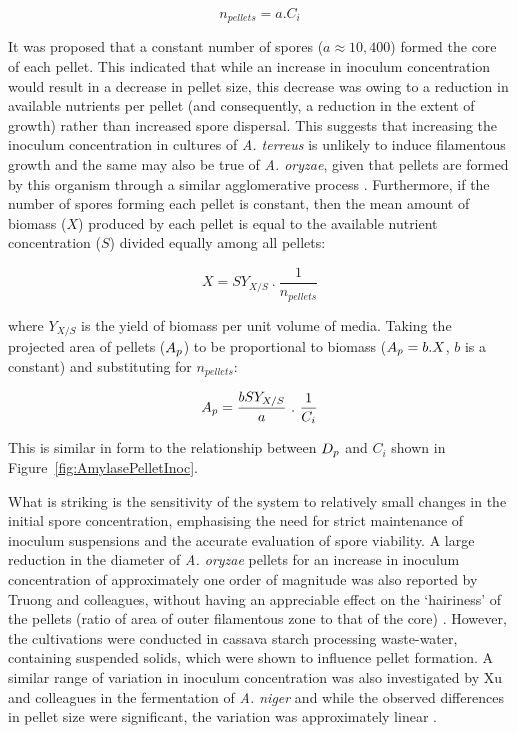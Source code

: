 \begin{equation}
	n_{pellets} = a . C_i
\end{equation}

\noindent It was proposed that a constant number of spores ($a \approx 10,400$) formed the core of each pellet. This indicated that while an increase in inoculum concentration would result in a decrease in pellet size, this decrease was owing to a reduction in available nutrients per pellet (and consequently, a reduction in the extent of growth) rather than increased spore dispersal. This suggests that increasing the inoculum concentration in cultures of \emph{A. terreus} is unlikely to induce filamentous growth and the same may also be true of \emph{A. oryzae}, given that pellets are formed by this organism through a similar agglomerative process \cite{carlsen1996a}. Furthermore, if the number of spores forming each pellet is constant, then the mean amount of biomass ($X$) produced by each pellet is equal to the available nutrient concentration ($S$) divided equally among all pellets:

\begin{equation}
	X = SY_{X/S} \ . \ \frac{1}{n_{pellets}}
\end{equation}

\noindent where $Y_{X/S}$ is the yield of biomass per unit volume of media. Taking the projected area of pellets ($A_p$) to be proportional to biomass ($A_p=b.X$, $b$ is a constant) and substituting for $n_{pellets}$:

\begin{equation}
	\Ap = \frac{bSY_{X/S}}{a} \ . \ \frac{1}{C_i}
\end{equation}

\noindent This is similar in form to the relationship between $D_p$ and $C_i$ shown in Figure~\ref{fig:AmylasePelletInoc}.

What is striking is the sensitivity of the system to relatively small changes in the initial spore concentration, emphasising the need for strict maintenance of inoculum suspensions and the accurate evaluation of spore viability. A large reduction in the diameter of \emph{A. oryzae} pellets for an increase in inoculum concentration of approximately one order of magnitude was also reported by Truong and colleagues, without having an appreciable effect on the \lq hairiness' of the pellets (ratio of area of outer filamentous zone to that of the core) \cite{truong2004}. However, the cultivations were conducted in cassava starch processing waste-water, containing suspended solids, which were shown to influence pellet formation. A similar range of variation in inoculum concentration was also investigated by Xu and colleagues in the fermentation of \emph{A. niger} and while the observed differences in pellet size were significant, the variation was approximately linear \cite{xu2000}.

